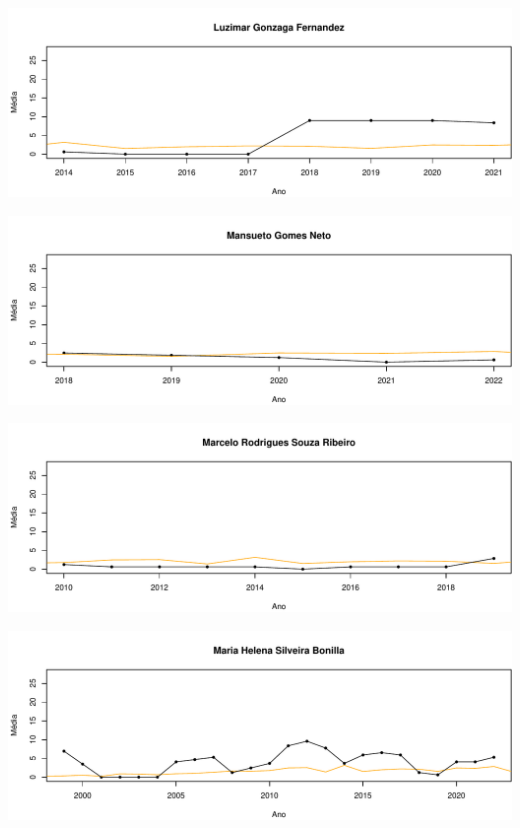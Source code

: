 \documentclass[12pt,brazil]{article}\usepackage[]{graphicx}\usepackage[]{xcolor}
\makeatletter
\def\maxwidth{ %
  \ifdim\Gin@nat@width>\linewidth
    \linewidth
  \else
    \Gin@nat@width
  \fi
}
\makeatother
\begin{document}
\vspace{0.5cm}


{\centering \includegraphics[width=\maxwidth]{figure/mediamovel-30} 

}



\vspace{0.5cm}


{\centering \includegraphics[width=\maxwidth]{figure/mediamovel-31} 

}



\vspace{0.5cm}


{\centering \includegraphics[width=\maxwidth]{figure/mediamovel-32} 

}



\vspace{0.5cm}


{\centering \includegraphics[width=\maxwidth]{figure/mediamovel-33} 

}
\end{document}
